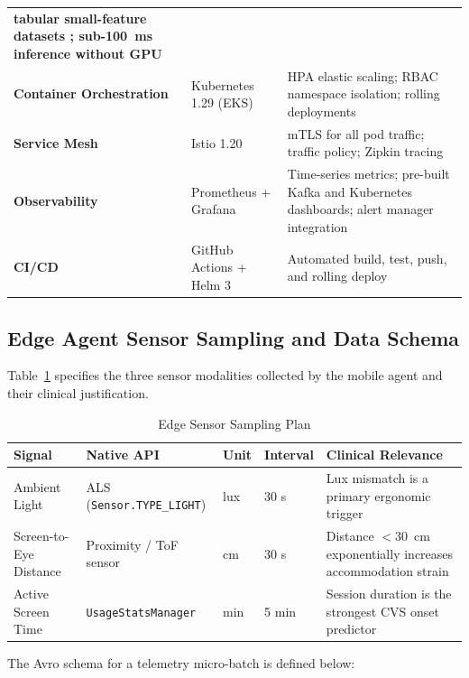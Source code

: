 \documentclass[conference]{IEEEtran}
\begin{document}
\begin{table}[H]
\begin{tabularx}{\textwidth}{>{\bfseries}p{3.5cm} p{3.5cm} X}
      tabular small-feature datasets \cite{b19}; sub-100~ms inference without GPU \\
    Container Orchestration & Kubernetes 1.29 (EKS) & HPA elastic scaling; RBAC
      namespace isolation; rolling deployments \cite{b20} \\
    Service Mesh & Istio 1.20 & mTLS for all pod traffic; traffic policy; Zipkin tracing \\
    Observability & Prometheus + Grafana & Time-series metrics; pre-built Kafka and
      Kubernetes dashboards; alert manager integration \\
    CI/CD & GitHub Actions + Helm 3 & Automated build, test, push, and rolling deploy \\
    \bottomrule
  \end{tabularx}
\end{table}

\subsection{Edge Agent Sensor Sampling and Data Schema}

Table~\ref{tab:sensors} specifies the three sensor modalities collected by the mobile
agent and their clinical justification.

\begin{table}[H]
  \centering
  \caption{Edge Sensor Sampling Plan}
  \label{tab:sensors}
  \begin{tabularx}{\textwidth}{p{3.2cm} p{3.8cm} p{2cm} p{1.8cm} X}
    \toprule
    \textbf{Signal} & \textbf{Native API} & \textbf{Unit} & \textbf{Interval} &
    \textbf{Clinical Relevance} \\
    \midrule
    Ambient Light & ALS (\texttt{Sensor.TYPE\_LIGHT}) & lux & 30 s &
      Lux mismatch is a primary ergonomic trigger \cite{b3} \\
    Screen-to-Eye Distance & Proximity / ToF sensor & cm & 30 s &
      Distance $<$30~cm exponentially increases accommodation strain \cite{b3} \\
    Active Screen Time & \texttt{UsageStatsManager} & min & 5 min &
      Session duration is the strongest CVS onset predictor \cite{b18} \\
    \bottomrule
  \end{tabularx}
\end{table}

The Avro schema for a telemetry micro-batch is defined below:
\end{document}
